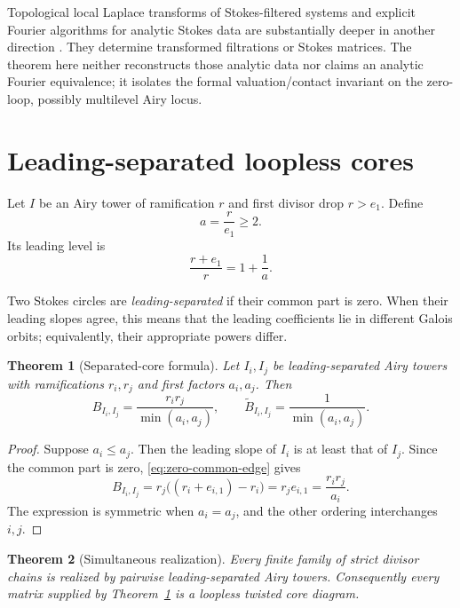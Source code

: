 \documentclass[11pt,a4paper]{amsart}
\theoremstyle{plain}
\newtheorem{theorem}{Theorem}[section]
\theoremstyle{definition}
\begin{document}
Topological local Laplace transforms of Stokes-filtered systems and explicit Fourier algorithms
for analytic Stokes data are substantially deeper in another direction
\cite{DoucotHohl2025,HienSabbah2015,Mochizuki2025}.  They determine transformed filtrations or
Stokes matrices.  The theorem here neither reconstructs those analytic data nor claims an analytic
Fourier equivalence; it isolates the formal valuation/contact invariant on the zero-loop,
possibly multilevel Airy locus.

\section{Leading-separated loopless cores}\label{sec:separated}

Let $I$ be an Airy tower of ramification $r$ and first divisor drop $r>e_1$.  Define
\begin{equation}\label{eq:first-factor}
 a=\frac r{e_1}\ge2.
\end{equation}
Its leading level is
\begin{equation}\label{eq:leading-slope}
 \frac{r+e_1}{r}=1+\frac1a.
\end{equation}

Two Stokes circles are \emph{leading-separated} if their common part is zero.  When their leading
slopes agree, this means that the leading coefficients lie in different Galois orbits; equivalently,
their appropriate powers differ.

\begin{theorem}[Separated-core formula]\label{thm:separated-core}
Let $I_i,I_j$ be leading-separated Airy towers with ramifications $r_i,r_j$ and first factors
$a_i,a_j$.  Then
\[
 B_{I_i,I_j}=\frac{r_ir_j}{\min(a_i,a_j)},
 \qquad
 \widetilde B_{I_i,I_j}=\frac1{\min(a_i,a_j)}.
\]
\end{theorem}

\begin{proof}
Suppose $a_i\le a_j$.  Then the leading slope of $I_i$ is at least that of $I_j$.  Since the
common part is zero, \eqref{eq:zero-common-edge} gives
\[
 B_{I_i,I_j}
 =r_j\bigl((r_i+e_{i,1})-r_i\bigr)
 =r_je_{i,1}
 =\frac{r_ir_j}{a_i}.
\]
The expression is symmetric when $a_i=a_j$, and the other ordering interchanges $i,j$.
\end{proof}

\begin{theorem}[Simultaneous realization]\label{thm:simultaneous}
Every finite family of strict divisor chains is realized by pairwise leading-separated Airy
towers.  Consequently every matrix supplied by Theorem~\ref{thm:separated-core} is a loopless
twisted core diagram.
\end{theorem}
\end{document}
